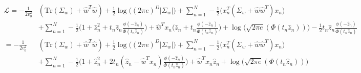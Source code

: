 \documentclass[10pt]{article}
\theoremstyle{plain}
\theoremstyle{definition}
\newcommand{\<}{\langle}
\renewcommand{\>}{\rangle}
\begin{document}
\begin{align*}
\mathcal L = 
- \frac{1}{2v_0^2}& (\text{Tr}(\Sigma_w) + \hat w^T \hat w) 
+  \frac{1}{2}\log \big((2\pi e)^D |\Sigma_w|) 
+ \sum_{n=1}^N - \frac{1}{2} \Big(x_n^T(\Sigma_w + \hat w \hat w^T)x_n\Big) \\
&+\sum_{n=1}^N
 -\frac{1}{2}\Big(1 + \hat z_n^2  + t_n\hat z_n \frac{\phi(-\hat z_n)}{\Phi(t_n\hat z_n)}\Big) 
 + \hat w^Tx_n\Big(\hat z_n + t_n\frac{\phi(-\hat z_n)}{\Phi(t_n\hat z_n)}\Big) 
 + \log\Big(\sqrt{2\pi e} (\Phi(t_n\hat z_n))\Big) 
 - \frac{1}{2}t_n\hat z_n\frac{ \phi(-\hat z_n)}{\Phi(t_n\hat z_n)}\\
= - \frac{1}{2v_0^2}& (\text{Tr}(\Sigma_w) + \hat w^T \hat w) 
+  \frac{1}{2}\log \big((2\pi e)^D |\Sigma_w|) 
+ \sum_{n=1}^N - \frac{1}{2} \Big(x_n^T(\Sigma_w + \hat w \hat w^T)x_n\Big) \\
&+\sum_{n=1}^N
 -\frac{1}{2}\Big(1 + \hat z_n^2  + 2t_n(\hat z_n-\hat w^Tx_n) \frac{\phi(-\hat z_n)}{\Phi(t_n\hat z_n)}\Big) 
 + \hat w^Tx_n\hat z_n 
 + \log\Big(\sqrt{2\pi e} (\Phi(t_n\hat z_n))\Big) \\
\end{align*}
\end{document}
